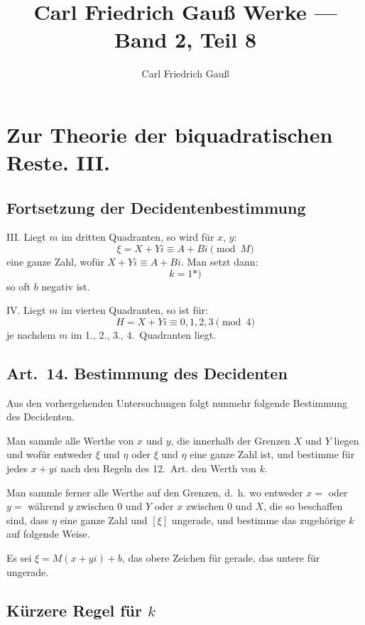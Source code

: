 \documentclass[12pt,a4paper]{article}
\title{Carl Friedrich Gauß Werke — Band 2, Teil 8}
\author{Carl Friedrich Gauß}
\date{}
\begin{document}
\maketitle
\thispagestyle{empty}

\tableofcontents
\newpage

\section*{Zur Theorie der biquadratischen Reste. III.}

\subsection*{Fortsetzung der Decidentenbestimmung}

III. Liegt $m$ im dritten Quadranten, so wird für $x$, $y$:
\[
\xi = X + Yi \equiv A + Bi \pmod{M}
\]
eine ganze Zahl, wofür $X + Yi \equiv A + Bi$. Man setzt dann:
\[
k = 1 \text{*)}
\]
so oft $b$ negativ ist.

IV. Liegt $m$ im vierten Quadranten, so ist für:
\[
H = X + Yi \equiv 0, 1, 2, 3 \pmod{4}
\]
je nachdem $m$ im 1., 2., 3., 4.~Quadranten liegt.

\subsection*{Art.~14. Bestimmung des Decidenten}

Aus den vorhergehenden Untersuchungen folgt nunmehr folgende Bestimmung des Decidenten.

Man sammle alle Werthe von $x$ und $y$, die innerhalb der Grenzen $X$ und $Y$ liegen und wofür entweder $\xi$ und $\eta$ oder $\xi$ und $\eta$ eine ganze Zahl ist, und bestimme für jedes $x + yi$ nach den Regeln des 12.~Art. den Werth von $k$.

Man sammle ferner alle Werthe auf den Grenzen, d.~h. wo entweder $x = $ oder $y = $ während $y$ zwischen $0$ und $Y$ oder $x$ zwischen $0$ und $X$, die so beschaffen sind, dass $\eta$ eine ganze Zahl und $[\xi]$ ungerade, und bestimme das zugehörige $k$ auf folgende Weise.

Es sei $\xi = M(x+yi) + b$, das obere Zeichen für gerade, das untere für ungerade.

\subsection*{Kürzere Regel für $k$}
\end{document}
